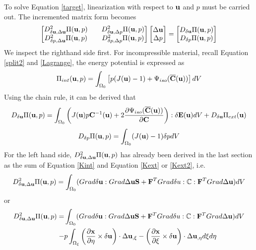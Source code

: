 To solve Equation \ref{target}, linearization with respect to $\bold{u}$ and $p$ must be carried out. The incremented matrix form becomes
\begin{equation} \label{linear}
\begin{bmatrix}
D_{\delta\bold{u}, \Delta\bold{u}}^2 \Pi(\bold{u}, p)  && D_{\delta\bold{u}, \Delta{p}}^2 \Pi(\bold{u}, p)  \\ D_{\delta{p}, \Delta\bold{u}}^2 \Pi(\bold{u}, p)  && D_{\delta{p}, \Delta{p}}^2 \Pi(\bold{u}, p) 
\end{bmatrix}
\begin{bmatrix}
\Delta\bold{u} \\ \Delta{p}
\end{bmatrix}
= 
\begin{bmatrix}
D_{\delta\bold{u}}\Pi(\bold{u}, p) \\ D_{\delta{p}}\Pi(\bold{u}, p) 
\end{bmatrix}
\end{equation}
We inspect the righthand side first. For incompressible material, recall Equation \ref{split2} and \ref{Lagrange}, the energy potential is expressed as
\begin{equation} \label{split3}
\Pi_{int}(\bold{u}, p) = \int_{\Omega_0} \left[ p(J(\bold{u}) - 1) + \Psi_{iso}(\overline{\bold{C}}(\bold{u}))\right] dV
\end{equation}
Using the chain rule, it can be derived that
\begin{equation}\label{rhs1}
D_{\delta\bold{u}}\Pi(\bold{u}, p) = \int_{\Omega_0}\left( J(\bold{u})p\bold{C}^{-1}(\bold{u}) + 
2\frac{\partial{\Psi_{iso}(\overline{\bold{C}}(\bold{u}))}}{\partial{\bold{C}}}  \right) : \delta\bold{E}(\bold{u}) dV + D_{\delta\bold{u}}\Pi_{ext}(\bold{u})
\end{equation}
\begin{equation}\label{rhs2}
D_{\delta{p}}\Pi(\bold{u}, p) = \int_{\Omega_0} (J(\bold{u}) - 1 )\delta{p} dV
\end{equation}
For the left hand side, $D_{\delta\bold{u}, \Delta\bold{u}}^2 \Pi(\bold{u}, p)$ has already been derived in the last section as the sum of Equation \ref{Kint} and Equation \ref{Kext} or \ref{Kext2}, i.e.
\begin{equation} \label{lhs0}
D_{\delta\bold{u}, \Delta\bold{u}}^2 \Pi(\bold{u}, p) =  \int_{\Omega_0}(Grad\delta\bold{u} : Grad\Delta\bold{u}\bold{S} + \bold{F}^TGrad\delta{u} : \mathbb{C} : \bold{F}^T Grad\Delta\bold{u})dV  \end{equation}
or
\begin{equation} \label{lhs1}
\begin{split}
D_{\delta\bold{u}, \Delta\bold{u}}^2 \Pi(\bold{u}, p) = & \int_{\Omega_0}(Grad\delta\bold{u} : Grad\Delta\bold{u}\bold{S} + \bold{F}^TGrad\delta{u} : \mathbb{C} : \bold{F}^T Grad\Delta\bold{u})dV  \\
 - & p\int_{\Omega_{\xi}}  \left(\frac{\partial{\bold{x}}}{\partial{\eta}} \times \delta\bold{u}\right) \cdot\Delta{\bold{u}}_{,\xi} - 
\left(\frac{\partial{\bold{x}}}{\partial{\xi}} \times \delta\bold{u}\right) \cdot\Delta{\bold{u}}_{,\eta} d\xi{d\eta}
\end{split}
\end{equation}
